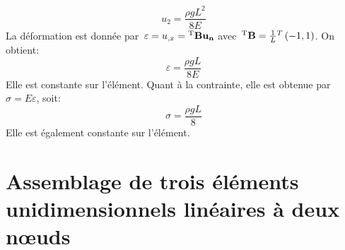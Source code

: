 \begin{equation} u_2 = \frac{\rho g L^2}{8 E} \end{equation}
\medskipvm
La déformation est donnée par~$\varepsilon=u_{,x}=\LL{B}\VV{u_n}$ avec~${}^\mathrm{T}\mathbf{B}=\frac1L {}^T\left( -1, 1\right)$.
On obtient:
\begin{equation}
\varepsilon=\frac{\rho g L}{8 E}
\end{equation} 
Elle est constante sur l'élément. Quant à la contrainte, elle est obtenue par~$\sigma=E\varepsilon$, soit:
\begin{equation}\sigma=\frac{\rho g L}8\end{equation} Elle est également constante sur l'élément.
\medskipvm
\ifVersionAvecExemplesSepares
  \section{Assemblage de trois éléments unidimensionnels linéaires à deux nœuds}\label{Sec-ass}
\else
